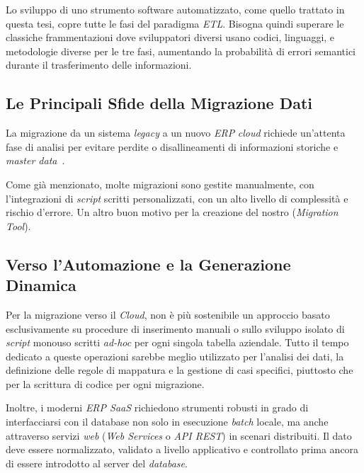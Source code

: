 Lo sviluppo di uno strumento software automatizzato, come quello trattato in questa tesi, copre tutte le fasi del
paradigma \textit{ETL}.
Bisogna quindi superare le classiche frammentazioni dove sviluppatori diversi usano codici, linguaggi,
e metodologie diverse per le tre fasi, aumentando la probabilità di errori semantici durante il trasferimento delle informazioni.

\subsection{Le Principali Sfide della Migrazione Dati}\label{subsec:sfide-e-problematiche-comuni}
La migrazione da un sistema \textit{legacy} a un nuovo \textit{ERP} \textit{cloud} richiede un'attenta fase di analisi per evitare perdite o
disallineamenti di informazioni storiche e \textit{master data}~\cite{gali2025master}.

Come già menzionato, molte migrazioni sono gestite manualmente, con l'integrazioni di \textit{script} scritti personalizzati,
con un alto livello di complessità e rischio d'errore.
Un altro buon motivo per la creazione del nostro (\textit{Migration Tool}).

\subsection{Verso l'Automazione e la Generazione Dinamica}\label{subsec:necessita-di-strumenti-di-automazione-e-generazione-dinamica}
Per la migrazione verso il \textit{Cloud}, non è più sostenibile un approccio basato esclusivamente su procedure di inserimento manuali 
o sullo sviluppo isolato di \textit{script} monouso scritti \textit{ad-hoc} per ogni singola tabella aziendale.
Tutto il tempo dedicato a queste operazioni sarebbe meglio utilizzato per l'analisi dei dati, la definizione delle regole di mappatura e la gestione di casi specifici,
piuttosto che per la scrittura di codice per ogni migrazione.

Inoltre, i moderni \textit{ERP SaaS} richiedono strumenti robusti in grado di interfacciarsi con il database non solo in 
esecuzione \textit{batch} locale, ma anche attraverso servizi \textit{web} (\textit{Web Services} o \textit{API REST}) in scenari distribuiti.
Il dato deve essere normalizzato, validato a livello applicativo e controllato prima ancora di essere introdotto al server del \textit{database}.

